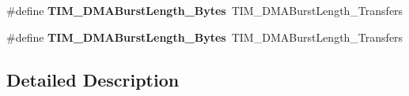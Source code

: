 \begin{DoxyCompactItemize}
\item 
\mbox{\label{group___t_i_m___legacy_gacffd0dc1f04aa06624a4980dcae6eede}} 
\#define {\bfseries T\+I\+M\+\_\+\+D\+M\+A\+Burst\+Length\+\_\+Bytes}~T\+I\+M\+\_\+\+D\+M\+A\+Burst\+Length\+\_\+Transfers
\item 
\mbox{\label{group___t_i_m___legacy_ga9c4d457417b1ba72ed0ae9886a75547a}} 
\#define {\bfseries T\+I\+M\+\_\+\+D\+M\+A\+Burst\+Length\+\_\+Bytes}~T\+I\+M\+\_\+\+D\+M\+A\+Burst\+Length\+\_\+Transfers
\end{DoxyCompactItemize}


\subsection{Detailed Description}
